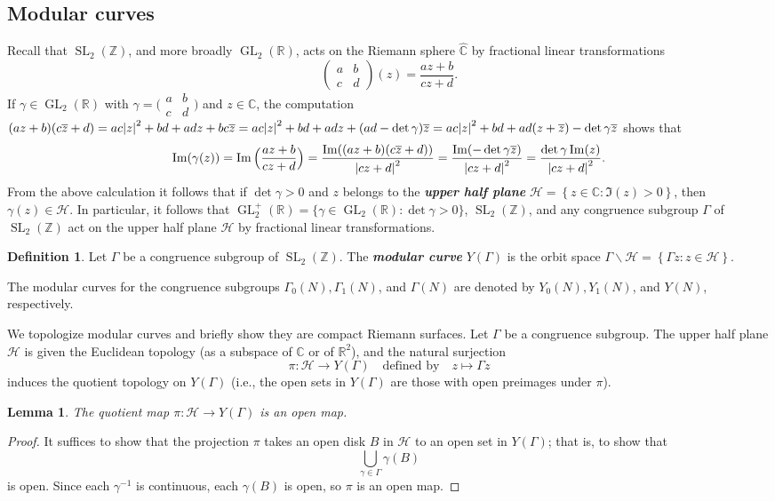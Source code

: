 \documentclass[10pt,leqno,twoside]{article}
\theoremstyle{plain}
\newtheorem{lemma}[lem]{Lemma}
\theoremstyle{definition}
\newtheorem{definition/}[lem]{Definition}
\newenvironment{definition}
  {\renewcommand{\qedsymbol}{\textdagger}%
   \pushQED{\qed}\begin{definition/}}
  {\popQED\end{definition/}}
\numberwithin{equation}{section}
\numberwithin{lem}{section}
\newcommand{\cbr}[1]{\left\{#1\right\}}
\newcommand{\textib}[1]{\textbf{\textit{#1\index{#1}}}} %
\DeclareMathOperator{\GL}{GL}
\DeclareMathOperator{\SL}{SL}
\newcommand{\smallabcd}{\big(\!\begin{smallmatrix}
    a & b \\ c & d
\end{smallmatrix}\!\big)}
\newcommand{\abcd}{\begin{pmatrix}
    a & b \\ c & d
\end{pmatrix}}
\newcommand{\slz}{\SL_2(\mathbb{Z})}
\newcommand{\glr}{\GL_2(\mathbb{R})}
\newcommand{\glrp}{\GL_2^+(\mathbb{R})}
\begin{document}
\subsection{Modular curves}
Recall that $\slz$, and more broadly $\glr$, acts on the Riemann sphere $\widehat{\mathbb{C}}$ by fractional linear transformations \[\abcd(z) = \frac{az+b}{cz+d}.\] 
If $\gamma\in \glr$ with $\gamma = \smallabcd$ and $z\in \mathbb C$, the computation $(az+b)(c\overline z + d) = ac\abs{z}^2+bd + adz + bc\overline z = ac\abs{z}^2+bd + adz + (ad-\det\gamma)\overline z = ac\abs{z}^2+bd + ad(z+\overline z) -\det\gamma\overline z$ shows that
\begin{equation}\label{eqn: imaginary parts}
    \Im(\gamma(z)) = \Im\Big(\frac{az+b}{cz+d}\Big) = \frac{\Im((az+b)(c\overline z + d))}{\abs{cz+d}^2} = \frac{\Im(-\det\gamma\overline z)}{\abs{cz+d}^2} = \frac{\det\gamma\Im(z)}{\abs{cz+d}^2}.
\end{equation}
From the above calculation it follows that if $\det \gamma >0$ and $z$ belongs to the \textib{upper half plane} $\mathcal{H} = \cbr{z\in\mathbb{C} : \Im(z)>0}$, then $\gamma(z)\in\mathcal H$. In particular, it follows that $\glrp = \{\gamma\in \glr : \det \gamma > 0\}$, $\slz$, and any congruence subgroup $\varGamma$ of $\slz$ act on the upper half plane $\mathcal H$ by fractional linear transformations.

\begin{definition}
    Let $\varGamma$ be a congruence subgroup of $\slz$. The \textib{modular curve} $Y(\varGamma)$ is the orbit space $\varGamma\backslash \mathcal{H} = \cbr{\varGamma z : z\in\mathcal H}$.
\end{definition}
The modular curves for the congruence subgroups $\varGamma_0(N), \varGamma_1(N)$, and $\varGamma(N)$ are denoted by $Y_0(N), Y_1(N)$, and $Y(N)$, respectively.

We topologize modular curves and briefly show they are compact Riemann surfaces. Let $\varGamma$ be a congruence subgroup. The upper half plane $\mathcal H$ is given the Euclidean topology (as a subspace of $\mathbb{C}$ or of $\mathbb{R}^2$), and the natural surjection \[\pi \colon \mathcal H \to Y(\varGamma)\quad \text{defined by}\quad  z\mapsto \varGamma z\] induces the quotient topology on $Y(\varGamma)$ (i.e., the open sets in $Y(\varGamma)$ are those with open preimages under $\pi$).

\begin{lemma}\label{lem: slz acts as open maps}
    The quotient map $\pi \colon \mathcal H \to Y(\varGamma)$ is an open map.
\end{lemma}
\begin{proof}
    It suffices to show that the projection $\pi$ takes an open disk $B$ in $\mathcal{H}$ to an open set in $Y(\varGamma)$; that is, to show that \[\bigcup_{\gamma\in \varGamma}\gamma(B)\] is open. Since each $\gamma^{-1}$ is continuous, each $\gamma(B)$ is open, so $\pi$ is an open map.
\end{proof}
\end{document}
